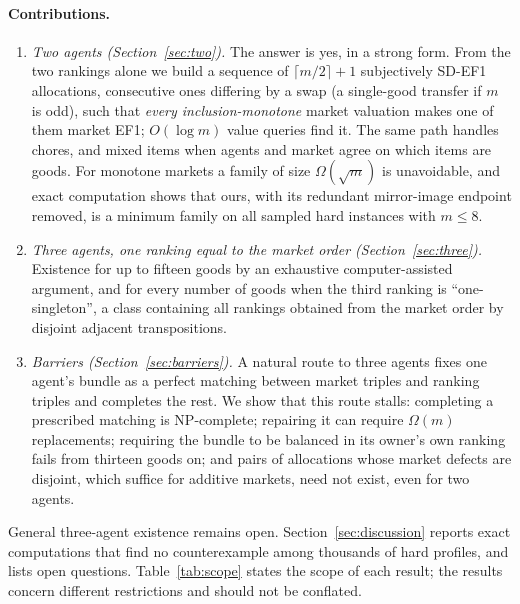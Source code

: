 \documentclass[sigconf,anonymous]{aamas}
\begin{document}
\paragraph{Contributions.}
\begin{enumerate}
\item \emph{Two agents (Section~\ref{sec:two}).} The answer is yes, in a strong form. From the two rankings alone we build a sequence of $\lceil m/2\rceil+1$ subjectively SD-EF1 allocations, consecutive ones differing by a swap (a single-good transfer if $m$ is odd), such that \emph{every inclusion-monotone} market valuation makes one of them market EF1; $O(\log m)$ value queries find it. The same path handles chores, and mixed items when agents and market agree on which items are goods. For monotone markets a family of size $\Omega(\sqrt m)$ is unavoidable, and exact computation shows that ours, with its redundant mirror-image endpoint removed, is a minimum family on all sampled hard instances with $m\le 8$.
\item \emph{Three agents, one ranking equal to the market order (Section~\ref{sec:three}).} Existence for up to fifteen goods by an exhaustive computer-assisted argument, and for every number of goods when the third ranking is ``one-singleton'', a class containing all rankings obtained from the market order by disjoint adjacent transpositions.
\item \emph{Barriers (Section~\ref{sec:barriers}).} A natural route to three agents fixes one agent's bundle as a perfect matching between market triples and ranking triples and completes the rest. We show that this route stalls: completing a prescribed matching is NP-complete; repairing it can require $\Omega(m)$ replacements; requiring the bundle to be balanced in its owner's own ranking fails from thirteen goods on; and pairs of allocations whose market defects are disjoint, which suffice for additive markets, need not exist, even for two agents.
\end{enumerate}
General three-agent existence remains open. Section~\ref{sec:discussion} reports exact computations that find no counterexample among thousands of hard profiles, and lists open questions. Table~\ref{tab:scope} states the scope of each result; the results concern different restrictions and should not be conflated.
\end{document}
